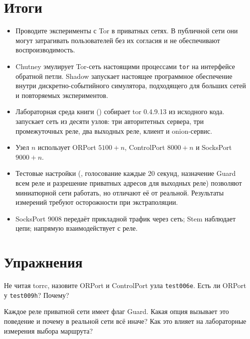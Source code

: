 \section*{Итоги}
\begin{itemize}
  \item Проводите эксперименты с Tor в приватных сетях. В публичной сети они могут затрагивать пользователей без их согласия и не обеспечивают воспроизводимость.
  \item Chutney эмулирует Tor-сеть настоящими процессами \texttt{tor} на интерфейсе обратной петли. Shadow запускает настоящее программное обеспечение внутри дискретно-событийного симулятора, подходящего для больших сетей и повторяемых экспериментов.
  \item Лабораторная среда книги () собирает tor 0.4.9.13 из исходного кода.  запускает сеть из десяти узлов: три авторитетных сервера, три промежуточных реле, два выходных реле, клиент и onion-сервис.
  \item Узел $n$ использует ORPort $5100+n$, ControlPort $8000+n$ и SocksPort $9000+n$.
  \item Тестовые настройки (, голосование каждые 20 секунд, назначение Guard всем реле и разрешение приватных адресов для выходных реле) позволяют миниатюрной сети работать, но отличают её от реальной. Результаты измерений требуют осторожности при экстраполяции.
  \item SocksPort 9008 передаёт прикладной трафик через сеть; Stem наблюдает цепи;  напрямую взаимодействует с реле.
\end{itemize}

\section*{Упражнения}

\begin{esercizio}[1]\label{es:19-porte}
Не читая torrc, назовите ORPort и ControlPort узла \texttt{test006e}. Есть ли ORPort у \texttt{test009h}? Почему?
\end{esercizio}

\begin{esercizio}[1]\label{es:19-guard}
Каждое реле приватной сети имеет флаг Guard. Какая опция вызывает это поведение и почему в реальной сети всё иначе? Как это влияет на лабораторные измерения выбора маршрута?
\end{esercizio}


